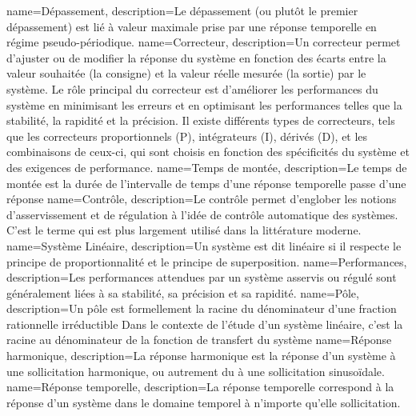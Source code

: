 %
{%
  name={Dépassement},%
  description={Le dépassement (ou plutôt le premier dépassement) 
  est lié à valeur maximale prise par une réponse temporelle en régime
  pseudo-périodique.  
  }
}
%
{%
  name={Correcteur},%
  description={Un correcteur permet d'ajuster ou 
               de modifier la réponse du système en fonction des écarts 
               entre la valeur souhaitée (la consigne) et la valeur 
               réelle mesurée (la sortie) par le système. Le rôle principal 
               du correcteur est d'améliorer les performances du système 
               en minimisant les erreurs et en optimisant les performances 
               telles que la stabilité, la rapidité et la précision. 
               Il existe différents types de correcteurs, tels que les correcteurs 
               proportionnels (P), intégrateurs (I), dérivés (D), 
               et les combinaisons de ceux-ci, qui sont choisis en fonction 
               des spécificités du système et des exigences de performance.}
}
%
{%
  name={Temps de montée},%
  description={Le temps de montée est la durée de l'intervalle de temps d'une 
  réponse temporelle passe d'une réponse 
  }
}
%
{%
  name={Contrôle},%
  description={Le contrôle permet d'englober les notions d'asservissement et
  de régulation à l'idée de contrôle automatique des systèmes. C'est le terme
  qui est plus largement utilisé dans la littérature moderne.  
  }
}
%
{%
  name={Système Linéaire},%
  description={Un système est dit linéaire si il respecte le principe
  de proportionnalité et le principe de superposition.
  }
}
%
{%
  name={Performances},%
  description={Les performances attendues par un système asservis ou régulé 
  sont généralement liées à sa stabilité, sa précision et sa rapidité.
  }
}
%
{%
  name={Pôle},%
  description={Un pôle est formellement la racine du dénominateur d'une
  fraction rationnelle irréductible Dans le contexte de l'étude d'un système
  linéaire, c'est la racine au dénominateur de
  la fonction de transfert du système
  }
}
%
{%
  name={Réponse harmonique},%
  description={La réponse harmonique est la réponse d'un système à une 
  sollicitation harmonique, ou autrement du à une sollicitation sinusoïdale.
  }
}
%
{%
  name={Réponse temporelle},%
  description={La réponse temporelle correspond à la réponse d'un système 
  dans le domaine temporel à n'importe qu'elle sollicitation.
  }
}
